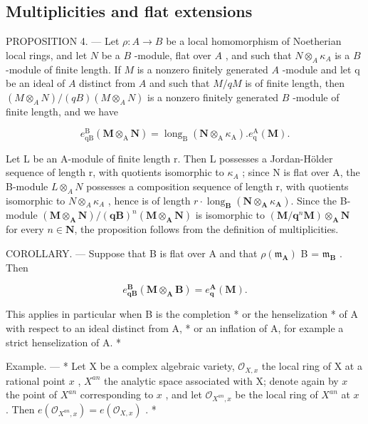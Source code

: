 \subsection{Multiplicities and flat extensions}

PROPOSITION 4. — Let \(\rho: A \to B\) be a local homomorphism of Noetherian local rings, and let \(N\) be a \(B\) -module, flat over \(A\) , and such that \(N \otimes_A \kappa_A\) is a \(B\) -module of finite length. If \(M\) is a nonzero finitely generated \(A\) -module and let q be an ideal of \(A\) distinct from \(A\) and such that \(M/qM\) is of finite length, then \((M \otimes_A N)/(qB)(M \otimes_A N)\) is a nonzero finitely generated \(B\) -module of finite length, and we have

\[
e _ {\mathrm{qB}} ^ {\mathrm{B}} (\mathbf {M} \otimes_ {\mathrm{A}} \mathbf {N}) = \operatorname{long} _ {\mathrm{B}} (\mathbf {N} \otimes_ {\mathrm{A}} \kappa_ {\mathrm{A}}). e _ {\mathrm{q}} ^ {\mathrm{A}} (\mathbf {M}).
\]

Let L be an A-module of finite length r. Then L possesses a Jordan-Hölder sequence of length r, with quotients isomorphic to \(\kappa_{A}\) ; since N is flat over A, the B-module \(L \otimes_{A} N\) possesses a composition sequence of length r, with quotients isomorphic to \(N \otimes_{A} \kappa_{A}\) , hence is of length \(r \cdot \operatorname{long}_{\mathbf{B}}(\mathbf{N} \otimes_{\mathbf{A}} \kappa_{\mathbf{A}})\). Since the B-module \((\mathbf{M} \otimes_{\mathbf{A}} \mathbf{N})/(\mathbf{q}\mathbf{B})^{n}(\mathbf{M} \otimes_{\mathbf{A}} \mathbf{N})\) is isomorphic to \((\mathbf{M}/\mathbf{q}^{n}\mathbf{M}) \otimes_{\mathbf{A}} \mathbf{N}\) for every \(n \in \mathbf{N}\), the proposition follows from the definition of multiplicities.

COROLLARY. — Suppose that B is flat over A and that \(\rho(\mathfrak{m}_{\mathbf{A}})\) B = \(\mathfrak{m}_{\mathbf{B}}\) . Then

\[
e _ {\mathbf {q B}} ^ {\mathbf {B}} (\mathbf {M} \otimes_ {\mathbf {A}} \mathbf {B}) = e _ {\mathbf {q}} ^ {\mathbf {A}} (\mathbf {M}).
\]

This applies in particular when B is the completion * or the henselization * of A with respect to an ideal distinct from A, * or an inflation of A, for example a strict henselization of A. *

Example. — * Let X be a complex algebraic variety, \(\mathcal{O}_{X,x}\) the local ring of X at a rational point \(x\) , \(X^{an}\) the analytic space associated with X; denote again by \(x\) the point of \(X^{an}\) corresponding to \(x\) , and let \(\mathcal{O}_{X^{an},x}\) be the local ring of \(X^{an}\) at \(x\) . Then \(e(\mathcal{O}_{X^{an},x}) = e(\mathcal{O}_{X,x})\) . *


